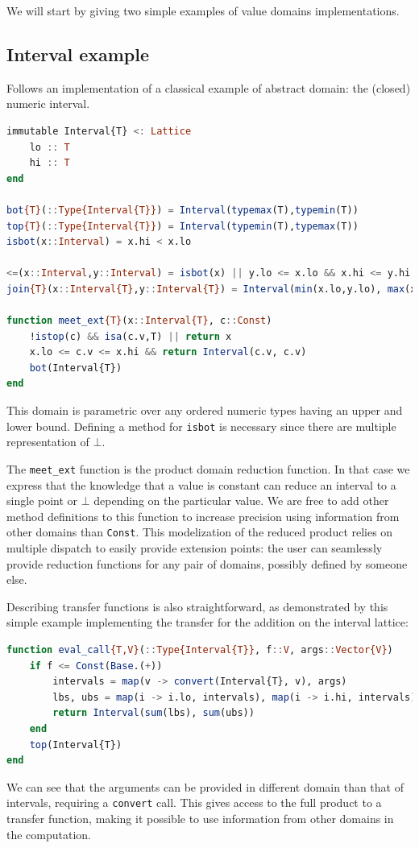 \documentclass[11pt]{article}
\begin{document}
We will start by giving two simple examples of value domains implementations.

\subsection*{Interval example}
Follows an implementation of a classical example of abstract domain: the (closed) numeric interval.
\begin{singlespace}
\begin{lstlisting}[language=julia]
immutable Interval{T} <: Lattice
    lo :: T
    hi :: T
end

bot{T}(::Type{Interval{T}}) = Interval(typemax(T),typemin(T))
top{T}(::Type{Interval{T}}) = Interval(typemin(T),typemax(T))
isbot(x::Interval) = x.hi < x.lo

<=(x::Interval,y::Interval) = isbot(x) || y.lo <= x.lo && x.hi <= y.hi
join{T}(x::Interval{T},y::Interval{T}) = Interval(min(x.lo,y.lo), max(x.hi,y.hi))

function meet_ext{T}(x::Interval{T}, c::Const)
    !istop(c) && isa(c.v,T) || return x
    x.lo <= c.v <= x.hi && return Interval(c.v, c.v)
    bot(Interval{T})
end
\end{lstlisting}
\end{singlespace}

This domain is parametric over any ordered numeric types having an upper and lower bound. Defining a method for \verb~isbot~ is necessary since there are multiple representation of $\bot$.

The \verb~meet_ext~ function is the product domain reduction function. In that case we express that the knowledge that a value is constant can reduce an interval to a single point or $\bot$ depending on the particular value. We are free to add other method definitions to this function to increase precision using information from other domains than \verb~Const~. This modelization of the reduced product relies on multiple dispatch to easily provide extension points: the user can seamlessly provide reduction functions for any pair of domains, possibly defined by someone else.

Describing transfer functions is also straightforward, as demonstrated by this simple example implementing the transfer for the addition on the interval lattice:
\begin{singlespace}
\begin{lstlisting}[language=julia]
function eval_call{T,V}(::Type{Interval{T}}, f::V, args::Vector{V})
    if f <= Const(Base.(+))
        intervals = map(v -> convert(Interval{T}, v), args)
        lbs, ubs = map(i -> i.lo, intervals), map(i -> i.hi, intervals)
        return Interval(sum(lbs), sum(ubs))
    end
    top(Interval{T})
end
\end{lstlisting}
\end{singlespace}
We can see that the arguments can be provided in different domain than that of intervals, requiring a \verb~convert~ call. This gives access to the full product to a transfer function, making it possible to use information from other domains in the computation.
\end{document}
